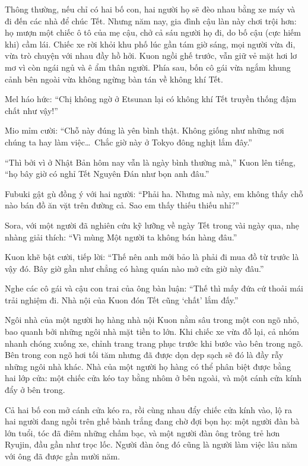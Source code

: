 \documentclass[../main.tex]{subfiles}
\begin{document}
Thông thường, nếu chỉ có hai bố con, hai người họ sẽ đèo nhau bằng xe máy và đi đến các nhà để chúc Tết. Nhưng năm nay, gia đình cậu làn này chơi trội hơn: họ mượn một chiếc ô tô của mẹ cậu, chở cả sáu người họ đi, do bố cậu (cực hiếm khi) cầm lái. Chiếc xe rời khỏi khu phố lúc gần tám giờ sáng, mọi người vừa đi, vừa trò chuyện với nhau đầy hồ hởi. Kuon ngồi ghế trước, vẫn giữ vẻ mặt hơi lơ mơ vì còn ngái ngủ và ê ẩm thân người. Phía sau, bốn cô gái vừa ngắm khung cảnh bên ngoài vừa không ngừng bàn tán về không khí Tết.

Mel háo hức: ``Chị không ngờ ở Etsunan lại có không khí Tết truyền thống đậm chất như vậy!''

Mio mỉm cười: ``Chỗ này đúng là yên bình thật. Không giống như những nơi chúng ta hay làm việc\dots\ Chắc giờ này ở Tokyo đông nghịt lắm đây.''

``Thì bởi vì ở Nhật Bản hôm nay vẫn là ngày bình thường mà,'' Kuon lên tiếng, ``họ bây giờ có nghỉ Tết Nguyên Đán như bọn anh đâu.''

Fubuki gật gù đồng ý với hai người: ``Phải ha. Nhưng mà này, em không thấy chỗ nào bán đồ ăn vặt trên đường cả. Sao em thấy thiếu thiếu nhỉ?''

Sora, với một người đã nghiên cứu kỹ lưỡng về ngày Tết trong vài ngày qua, nhẹ nhàng giải thích: ``Vì mùng Một người ta không bán hàng đâu.''

Kuon khẽ bật cười, tiếp lời: ``Thế nên anh mới bảo là phải đi mua đồ từ trước là vậy đó. Bây giờ gần như chẳng có hàng quán nào mở cửa giờ này đâu.''

Nghe các cô gái và cậu con trai của ông bàn luận: ``Thế thì mấy đứa cứ thoải mái trải nghiệm đi. Nhà nội của Kuon đón Tết cũng `chất' lắm đấy.''

\ct

Ngôi nhà của một người họ hàng nhà nội Kuon nằm sâu trong một con ngõ nhỏ, bao quanh bởi những ngôi nhà mặt tiền to lớn. Khi chiếc xe vừa đỗ lại, cả nhóm nhanh chóng xuống xe, chỉnh trang trang phục trước khi bước vào bên trong ngõ. Bên trong con ngõ hơi tối tăm nhưng đã được dọn dẹp sạch sẽ đó là đầy rẫy những ngôi nhà khác. Nhà của một người họ hàng có thể phân biệt được bằng hai lớp cửa: một chiếc cửa kéo tay bằng nhôm ở bên ngoài, và một cánh cửa kính đẩy ở bên trong.

Cả hai bố con mở cánh cửa kéo ra, rồi cùng nhau đẩy chiếc cửa kính vào, lộ ra hai người đang ngồi trên ghế bành trắng đang chờ đợi bọn họ: một người đàn bà lớn tuổi, tóc đã điêm những chấm bạc, và một người đàn ông trông trẻ hơn Ryujin, đầu gần như trọc lốc. Người đàn ông đó cũng là người làm việc lâu năm với ông đã được gần mười năm.
\end{document}
